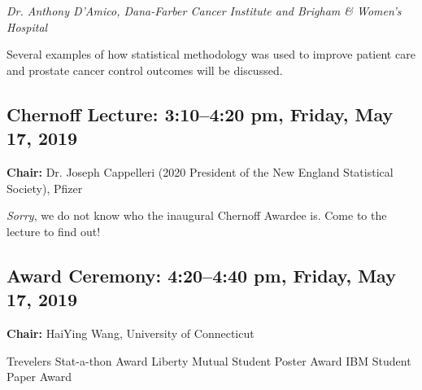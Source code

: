 \documentclass[10pt]{article}
\begin{document}
\emph{Dr. Anthony D'Amico, Dana-Farber Cancer Institute and Brigham \& Women's Hospital}

Several examples of how statistical methodology was used to improve
patient care and prostate cancer control outcomes will be discussed.


\subsection*{Chernoff Lecture: \hfill 3:10--4:20 pm, Friday, May 17, 2019}
{\bf Chair:}
Dr. Joseph Cappelleri (2020 President of the New England
Statistical Society),  Pfizer

\emph{Sorry}, we do not know who the inaugural Chernoff Awardee is. Come to the
lecture to find out!

\subsection*{Award Ceremony: \hfill 4:20--4:40 pm, Friday, May 17, 2019}

{\bf Chair:} HaiYing Wang, University of Connecticut

Trevelers Stat-a-thon Award\hfill
Liberty Mutual Student Poster Award \hfill
IBM Student Paper Award

\clearpage

{}


\clearpage

\twocolumn
\raggedright



\clearpage

\end{document}
